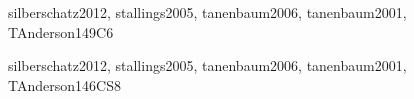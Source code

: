 \begin{syllabus}
\begin{unit}{\OSConcurrency}{}{silberschatz2012, stallings2005, tanenbaum2006, tanenbaum2001, TAnderson14}{9}{C6}
\begin{topics}
      \item \OSConcurrencyTopicStates
      \item \OSConcurrencyTopicStructures
      \item \OSConcurrencyTopicDispatching
      \item \OSConcurrencyTopicTheRole
      \item \OSConcurrencyTopicManaging
      \item \OSConcurrencyTopicImplementing
      \item \OSConcurrencyTopicMultiprocessor
\end{topics}
\begin{learningoutcomes}
	\item \OSConcurrencyLODescribeTheConcurrency [\Familiarity]
	\item \OSConcurrencyLODemonstrateTheTime [\Usage]
	\item \OSConcurrencyLOSummarizeTheMechanisms [\Familiarity]
	\item \OSConcurrencyLOExplainTheThat [\Familiarity]
	\item \OSConcurrencyLOSummarizeTechniques [\Familiarity]
	\item \OSConcurrencyLODescribeReasons [\Familiarity]
	\item \OSConcurrencyLOCreateState [\Usage]
\end{learningoutcomes}
\end{unit}

\begin{unit}{\OSSchedulingandDispatch}{}{silberschatz2012, stallings2005, tanenbaum2006, tanenbaum2001, TAnderson14}{6}{CS8}
\begin{topics}%
      \item \OSSchedulingandDispatchTopicPreemptive
      \item \OSSchedulingandDispatchTopicSchedulers
      \item \OSSchedulingandDispatchTopicProcesses
      \item \OSSchedulingandDispatchTopicDeadlines
\end{topics}
\begin{learningoutcomes}
	\item \OSSchedulingandDispatchLOCompareAndCommon  [\Assessment]
	\item \OSSchedulingandDispatchLODescribeRelationships [\Familiarity]
	\item \OSSchedulingandDispatchLODiscussTheProcessor [\Familiarity]
	\item \OSSchedulingandDispatchLODescribeTheProcesses [\Familiarity]
	\item \OSSchedulingandDispatchLOCompareAndAndTo  [\Assessment]
	\item \OSSchedulingandDispatchLODiscussThePreemption [\Familiarity]
	\item \OSSchedulingandDispatchLOIdentifyWays [\Familiarity]
\end{learningoutcomes}
\end{unit}


\end{syllabus}

